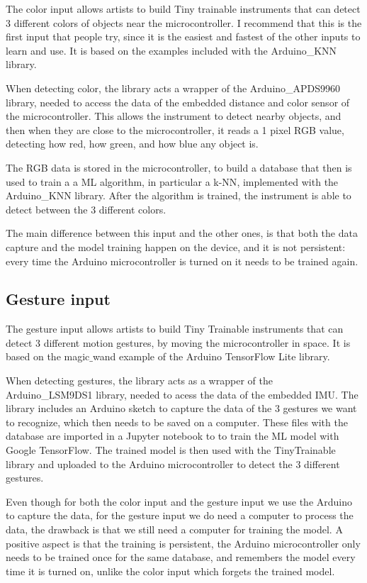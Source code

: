 The color input allows artists to build Tiny trainable instruments that can detect 3 different colors of objects near the microcontroller. I recommend that this is the first input that people try, since it is the easiest and fastest of the other inputs to learn and use. It is based on the examples included with the Arduino{\_}KNN library.

When detecting color, the library acts a wrapper of the Arduino{\_}APDS9960 library, needed to access the data of the embedded distance and color sensor of the microcontroller. This allows the instrument to detect nearby objects, and then when they are close to the microcontroller, it reads a 1 pixel \acrshort{RGB} value, detecting how red, how green, and how blue any object is.

The \acrshort{RGB} data is stored in the microcontroller, to build a database that then is used to train a a \acrshort{ML} algorithm, in particular a \acrfull{k-NN}, implemented with the Arduino{\_}KNN library. After the algorithm is trained, the instrument is able to detect between the 3 different colors.

The main difference between this input and the other ones, is that both the data capture and the model training happen on the device, and it is not persistent: every time the Arduino microcontroller is turned on it needs to be trained again.

\subsection{Gesture input}

The gesture input allows artists to build Tiny Trainable instruments that can detect 3 different motion gestures, by moving the microcontroller in space. It is based on the magic$\_$wand example of the Arduino TensorFlow Lite library.

When detecting gestures, the library acts as a wrapper of the Arduino{\_}LSM9DS1 library, needed to acess the data of the embedded \acrfull{IMU}. The library includes an Arduino sketch to capture the data of the 3 gestures we want to recognize, which then needs to be saved on a computer. These files with the database are imported in a Jupyter notebook to to train the \acrshort{ML} model with Google TensorFlow. The trained model is then used with the TinyTrainable library and uploaded to the Arduino microcontroller to detect the 3 different gestures.

Even though for both the color input and the gesture input we use the Arduino to capture the data, for the gesture input we do need a computer to process the data, the drawback is that we still need a computer for training the model. A positive aspect is that the training is persistent, the Arduino microcontroller only needs to be trained once for the same database, and remembers the model every time it is turned on, unlike the color input which forgets the trained model.

